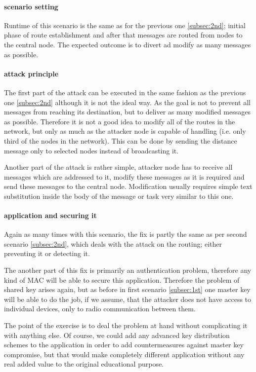 \documentclass[
  print, %
  Table,   %
  nolof,     %
  nolot,     %
           oneside
]{fithesis3}
\begin{document}
    \paragraph{scenario setting}
    Runtime of this scenario is the same as for the previous one \ref{subsec:2nd}; initial phase of route establishment and after that messages are routed from nodes to the central node. The expected outcome is to divert ad modify as many messages as possible.

    \paragraph{attack principle}
    The first part of the attack can be executed in the same fashion as the previous one \ref{subsec:2nd} although it is not the ideal way. As the goal is not to prevent all messages from reaching its destination, but to deliver as many modified messages as possible. Therefore it is not a good idea to modify all of the routes in the network, but only as much as the attacker node is capable of handling (i.e. only third of the nodes in the network). This can be done by sending the distance message only to selected nodes instead of broadcasting it.

    Another part of the attack is rather simple, attacker node has to receive all messages which are addressed to it, modify these messages as it is required and send these messages to the central node. Modification usually requires simple text substitution inside the body of the message or task very similar to this one.

    \paragraph{application and securing it}
    Again as many times with this scenario, the fix is partly the same as per second scenario \ref{subsec:2nd}, which deals with the attack on the routing; either preventing it or detecting it.

    The another part of this fix is primarily an authentication problem, therefore any kind of MAC will be able to secure this application. Therefore the problem of shared key arises again, but as before in first scenario \ref{subsec:1st} one master key will be able to do the job, if we assume, that the attacker does not have access to individual devices, only to radio communication between them.

    The point of the exercise is to deal the problem at hand without complicating it with anything else. Of course, we could add any advanced key distribution schemes  %
    to the application in order to add countermeasures against master key compromise, but that would make completely different application without any real added value to the original educational purpose.
\end{document}
